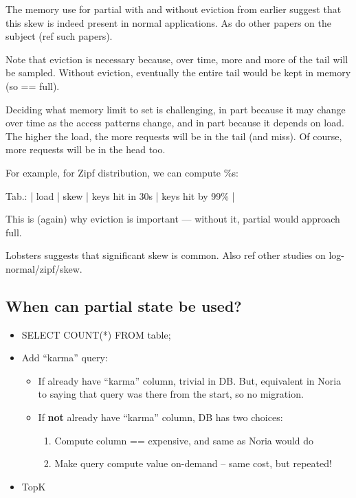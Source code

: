 \begin{inprogress}
The memory use for partial with and without eviction from earlier suggest that
this skew is indeed present in normal applications. As do other papers on the
subject (ref such papers).
\end{inprogress}

\begin{inprogress}
Note that eviction is necessary because, over time, more and more of the
tail will be sampled. Without eviction, eventually the entire tail would
be kept in memory (so == full).
\end{inprogress}

Deciding what memory limit to set is challenging, in part because it
may change over time as the access patterns change, and in part because
it depends on load. The higher the load, the more requests will be in
the tail (and miss). Of course, more requests will be in the head too.


For example, for Zipf distribution, we can compute \%s:

Tab.: | load | skew | keys hit in 30s | keys hit by 99\% | 

This is (again) why eviction is important — without it, partial would approach
full.

Lobsters suggests that significant skew is common. Also ref other
studies on log-normal/zipf/skew.

\subsection{When can partial state be used?}

\begin{itemize}
 \item SELECT COUNT(*) FROM table;
 \item Add ``karma'' query:
   \begin{itemize}
    \item If already have ``karma'' column, trivial in DB. But, equivalent in
      Noria to saying that query was there from the start, so no migration.
    \item If \textbf{not} already have ``karma'' column, DB has two choices:
     \begin{enumerate}
      \item Compute column == expensive, and same as Noria would do
      \item Make query compute value on-demand -- same cost, but repeated!
     \end{enumerate}
   \end{itemize}
 \item TopK
\end{itemize}

